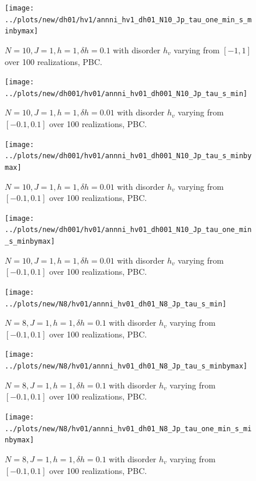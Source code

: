 \documentclass[a4paper]{article}
\begin{document}
\begin{figure}[h!]
  \centering
  \texttt{[image: ../plots/new/dh01/hv1/annni\_hv1\_dh01\_N10\_Jp\_tau\_one\_min\_s\_minbymax]}
  \caption{$N = 10, J = 1, h = 1, \delta h=0.1$ with disorder $h_v$ varying from $[-1,1]$ over 100 realizations, PBC.}
  \label{fig:}
\end{figure}

\begin{figure}[h!]
  \centering
  \texttt{[image: ../plots/new/dh001/hv01/annni\_hv01\_dh001\_N10\_Jp\_tau\_s\_min]}
  \caption{$N = 10, J = 1, h = 1, \delta h=0.01$ with disorder $h_v$ varying from $[-0.1,0.1]$ over 100 realizations, PBC.}
  \label{fig:}
\end{figure}

\begin{figure}[h!]
  \centering
  \texttt{[image: ../plots/new/dh001/hv01/annni\_hv01\_dh001\_N10\_Jp\_tau\_s\_minbymax]}
  \caption{$N = 10, J = 1, h = 1, \delta h=0.01$ with disorder $h_v$ varying from $[-0.1,0.1]$ over 100 realizations, PBC.}
  \label{fig:}
\end{figure}

\begin{figure}[h!]
  \centering
  \texttt{[image: ../plots/new/dh001/hv01/annni\_hv01\_dh001\_N10\_Jp\_tau\_one\_min\_s\_minbymax]}
  \caption{$N = 10, J = 1, h = 1, \delta h=0.01$ with disorder $h_v$ varying from $[-0.1,0.1]$ over 100 realizations, PBC.}
  \label{fig:}
\end{figure}


\begin{figure}[h!]
  \centering
  \texttt{[image: ../plots/new/N8/hv01/annni\_hv01\_dh01\_N8\_Jp\_tau\_s\_min]}
  \caption{$N = 8, J = 1, h = 1, \delta h=0.1$ with disorder $h_v$ varying from $[-0.1,0.1]$ over 100 realizations, PBC.}
  \label{fig:}
\end{figure}

\begin{figure}[h!]
  \centering
  \texttt{[image: ../plots/new/N8/hv01/annni\_hv01\_dh01\_N8\_Jp\_tau\_s\_minbymax]}
  \caption{$N = 8, J = 1, h = 1, \delta h=0.1$ with disorder $h_v$ varying from $[-0.1,0.1]$ over 100 realizations, PBC.}
  \label{fig:}
\end{figure}

\begin{figure}[h!]
  \centering
  \texttt{[image: ../plots/new/N8/hv01/annni\_hv01\_dh01\_N8\_Jp\_tau\_one\_min\_s\_minbymax]}
  \caption{$N = 8, J = 1, h = 1, \delta h=0.1$ with disorder $h_v$ varying from $[-0.1,0.1]$ over 100 realizations, PBC.}
  \label{fig:}
\end{figure}
\end{document}
